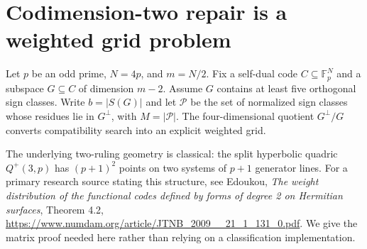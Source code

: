 \section{Codimension-two repair is a weighted grid problem}
\label{sec:quotient-grid}

Let $p$ be an odd prime, $N=4p$, and $m=N/2$. Fix a self-dual code
$C\subseteq\mathbb F_p^N$ and a subspace $G\subseteq C$ of dimension
$m-2$. Assume $G$ contains at least five orthogonal sign classes.
Write $b=|S(G)|$ and let $\mathcal P$ be the set of normalized sign
classes whose residues lie in $G^\perp$, with $M=|\mathcal P|$.
The four-dimensional quotient $G^\perp/G$ converts compatibility
search into an explicit weighted grid.

The underlying two-ruling geometry is classical: the split hyperbolic
quadric $Q^+(3,p)$ has $(p+1)^2$ points on two systems of $p+1$
generator lines. For a primary research source stating this structure,
see Edoukou, \emph{The weight distribution of the functional codes
defined by forms of degree 2 on Hermitian surfaces}, Theorem 4.2,
\url{https://www.numdam.org/article/JTNB_2009__21_1_131_0.pdf}.
We give the matrix proof needed here rather than relying on a
classification implementation.

